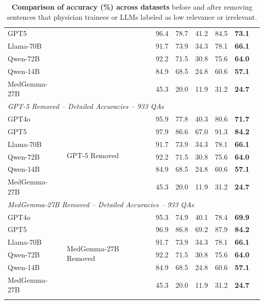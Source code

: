 \documentclass[11pt]{article}
\begin{document}
\begin{longtable}{llllllll}
GPT5 &  & 96.4 & 78.7 & 41.2 & 84.5 & \textbf{73.1} \\
Llama-70B &  & 91.7 & 73.9 & 34.3 & 78.1 & \textbf{66.1} \\
Qwen-72B &  & 92.2 & 71.5 & 30.8 & 75.6 & \textbf{64.0} \\
Qwen-14B &  & 84.9 & 68.5 & 24.8 & 60.6 & \textbf{57.1} \\
MedGemma-27B &  & 45.3 & 20.0 & 11.9 & 31.2 & \textbf{24.7} \\
\midrule
\multicolumn{7}{l}{\textit{GPT-5 Removed -- Detailed Accuracies -- 933 QAs}} \\
\midrule
GPT4o & \multirow{6}{*}{GPT-5 Removed} & 95.9 & 77.8 & 40.3 & 80.6 & \textbf{71.7} \\
GPT5 &  & 97.9 & 86.6 & 67.0 & 91.3 & \textbf{84.2} \\
Llama-70B &  & 91.7 & 73.9 & 34.3 & 78.1 & \textbf{66.1} \\
Qwen-72B &  & 92.2 & 71.5 & 30.8 & 75.6 & \textbf{64.0} \\
Qwen-14B &  & 84.9 & 68.5 & 24.8 & 60.6 & \textbf{57.1} \\
MedGemma-27B &  & 45.3 & 20.0 & 11.9 & 31.2 & \textbf{24.7} \\
\midrule
\multicolumn{7}{l}{\textit{MedGemma-27B Removed -- Detailed Accuracies -- 933 QAs}} \\
\midrule
GPT4o & \multirow{6}{*}{MedGemma-27B Removed} & 95.3 & 74.9 & 40.1 & 78.4 & \textbf{69.9} \\
GPT5 &  & 96.9 & 86.8 & 69.2 & 87.9 & \textbf{84.2} \\
Llama-70B &  & 91.7 & 73.9 & 34.3 & 78.1 & \textbf{66.1} \\
Qwen-72B &  & 92.2 & 71.5 & 30.8 & 75.6 & \textbf{64.0} \\
Qwen-14B &  & 84.9 & 68.5 & 24.8 & 60.6 & \textbf{57.1} \\
MedGemma-27B &  & 45.3 & 20.0 & 11.9 & 31.2 & \textbf{24.7} \\
\bottomrule
\caption{\textbf{Comparison of accuracy (\%) across datasets} before and after removing sentences that physician trainees or LLMs labeled as low relevance or irrelevant.}
\label{tab:comparison}
\end{longtable}
\end{document}
